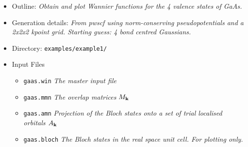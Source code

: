 \documentclass[a4paper,11pt,twoside]{article}
\begin{document}
\begin{itemize}
\item{Outline: \it{Obtain and plot Wannier functions for the 4 valence states of GaAs.}}
\item{Generation details: \it{From pwscf using norm-conserving pseudopotentials
and a 2x2x2 kpoint grid. Starting guess: 4 bond centred Gaussians.}}
\item{Directory: {\tt examples/example1/}}
\item{Input Files}
\begin{itemize}
\item{ {\tt gaas.win}  {\it The master input file}}
\item{ {\tt gaas.mmn}  {\it The overlap matrices $M_{{\bf k}}$}}
\item{ {\tt gaas.amn}  {\it Projection of the Bloch states onto a set of trial localised orbitals $A_{{\bf k}}$}}
\item{ {\tt gaas.bloch}  {\it The Bloch states in the real space unit cell. For plotting only.}}
\end{itemize}
\end{itemize}
\end{document}
